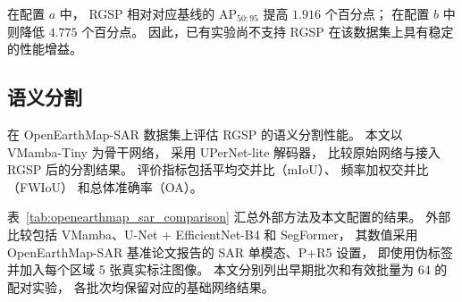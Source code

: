 在配置 $a$ 中，
RGSP 相对对应基线的 AP$_{50:95}$
提高 $1.916$ 个百分点；
在配置 $b$ 中则降低 $4.775$ 个百分点。
因此，已有实验尚不支持
RGSP 在该数据集上具有稳定的性能增益。
\FloatBarrier
\subsection{语义分割}
\label{sec:segmentation_results}

在 OpenEarthMap-SAR 数据集上评估 RGSP 的语义分割性能。
本文以 VMamba-Tiny 为骨干网络，
采用 UPerNet-lite 解码器，
比较原始网络与接入 RGSP 后的分割结果。
评价指标包括平均交并比（mIoU）、
频率加权交并比（FWIoU）
和总体准确率（OA）。

表~\ref{tab:openearthmap_sar_comparison}
汇总外部方法及本文配置的结果。
外部比较包括 VMamba、U-Net + EfficientNet-B4
和 SegFormer，
其数值采用 OpenEarthMap-SAR 基准论文报告的
SAR 单模态、P+R5 设置，
即使用伪标签并加入每个区域 5 张真实标注图像。
本文分别列出早期批次和有效批量为 64 的配对实验，
各批次均保留对应的基础网络结果。

